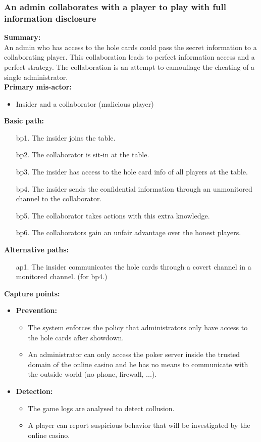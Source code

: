 \documentclass[a4paper,11pt]{report}
\begin{document}
\subsubsection{An admin collaborates with a player to play with full information disclosure}
\textbf{Summary:} \\
An admin who has access to the hole cards could pass the secret information to a collaborating player. This collaboration leads to perfect information access and a perfect strategy. The collaboration is an attempt to camouflage the cheating of a single administrator. \\
\textbf{Primary mis-actor:}
\begin{itemize}
\item Insider and a collaborator (malicious player)
\end{itemize}
\textbf{Basic path:}
\begin{enumerate}
\item[bp1.] The insider joins the table.
\item[bp2.] The collaborator is sit-in at the table.
\item[bp3.] The insider has access to the hole card info of all players at the table.
\item[bp4.] The insider sends the confidential information through an unmonitored channel to the collaborator.
\item[bp5.] The collaborator takes actions with this extra knowledge.
\item[bp6.] The collaborators gain an unfair advantage over the honest players.
\end{enumerate}
\textbf{Alternative paths:}
\begin{itemize}
\item[ap1.] The insider communicates the hole cards through a covert channel in a monitored channel. (for bp4.)
\end{itemize}
\textbf{Capture points:}
\begin{itemize}
\item \textbf{Prevention:}
\begin{itemize}
\item The system enforces the policy that administrators only have access to the hole cards after showdown.
\item An administrator can only access the poker server inside the trusted domain of the online casino and he has no means to communicate with the outside world (no phone, firewall, ...).
\end{itemize}
\item \textbf{Detection:}
\begin{itemize}
\item The game logs are analysed to detect collusion.
\item A player can report suspicious behavior that will be investigated by the online casino.
\end{itemize}
\end{itemize}
\end{document}
